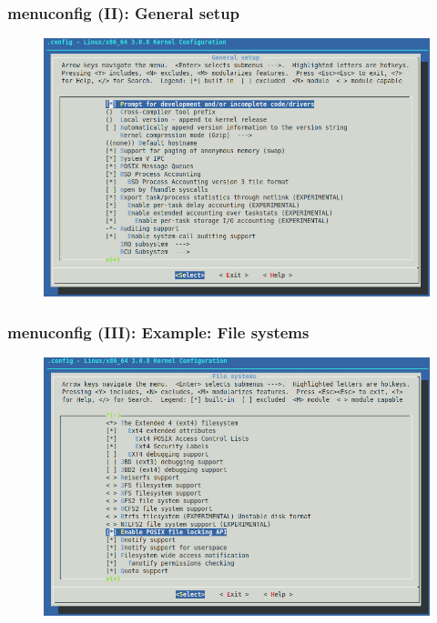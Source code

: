 \documentclass{beamer}
\begin{document}
\begin{frame}
\frametitle{menuconfig (II): General setup}
 
\begin{figure}
  \centering
	\includegraphics[scale=0.3,clip=true]{figs/menuconfig_generalsetup.png}
  \label{fig:menuconfig_menuconfig}
\end{figure}

\end{frame}


\begin{frame}
\frametitle{menuconfig (III): Example: File systems}
 
\begin{figure}
  \centering
	\includegraphics[scale=0.3,clip=true]{figs/menuconfig_filesystems.png}
  \label{fig:menuconfig_filesystems}
\end{figure}

\end{frame}
\end{document}
